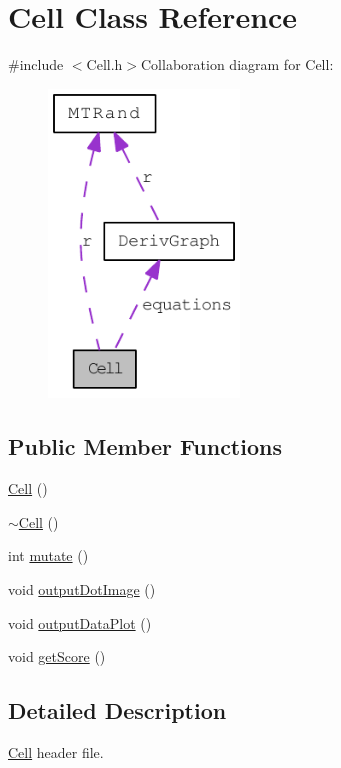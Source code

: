 \hypertarget{classCell}{
\section{Cell Class Reference}
\label{classCell}
}


{\ttfamily \#include $<$Cell.h$>$}Collaboration diagram for Cell:\nopagebreak
\begin{figure}[H]
\begin{center}
\leavevmode
\includegraphics[width=144pt]{classCell__coll__graph}
\end{center}
\end{figure}
\subsection*{Public Member Functions}
\begin{DoxyCompactItemize}
\item 
\hyperlink{classCell_a394510643e8664cf12b5efaf5cb99f71}{Cell} ()
\item 
\hyperlink{classCell_a9fa559f7a28e2b4336c6879ca09304d8}{$\sim$Cell} ()
\item 
int \hyperlink{classCell_a555fa98c5f1dc8d7c88c7a24f69994ff}{mutate} ()
\item 
void \hyperlink{classCell_a535ddddc0471fa874a0b22a54bd38c1a}{outputDotImage} ()
\item 
void \hyperlink{classCell_a8e117526c56dda4d0d56d840d1558835}{outputDataPlot} ()
\item 
void \hyperlink{classCell_aa36f550bfdb53c896ca1dd0be03eac70}{getScore} ()
\end{DoxyCompactItemize}


\subsection{Detailed Description}
\hyperlink{classCell}{Cell} header file. 

